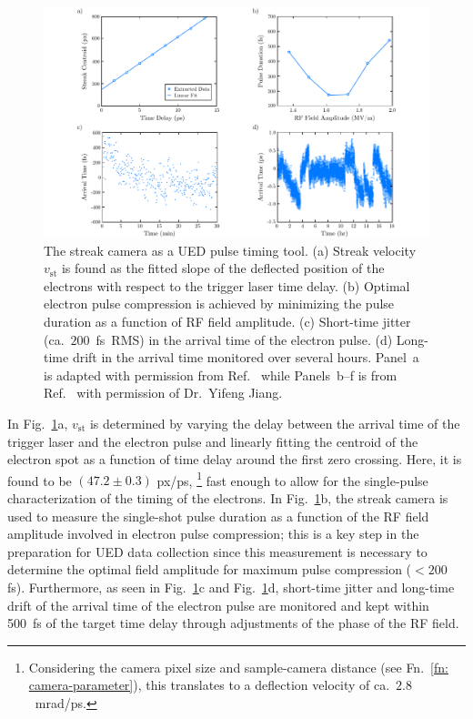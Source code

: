 \begin{figure}[ht!]
  \centering
  \includegraphics[width = \textwidth]{Figures/fig_ch2_electron-char2.pdf}
  \caption[The streak camera as a UED pulse timing tool.]{
    The streak camera as a UED pulse timing tool.
    (a) Streak velocity~$v_\textrm{st}$ is found as the fitted slope of the deflected position of the
    electrons with respect to the trigger laser time delay.
    (b) Optimal electron pulse compression is achieved by minimizing
    the pulse duration as a function of RF field amplitude.
    (c) Short-time jitter (ca.~$200$~fs~RMS) in the arrival time of the electron pulse.
    (d) Long-time drift in the arrival time monitored over several hours.
    Panel~a is adapted with permission from Ref.~\cite{Jiang2013} while
    Panels~b--f is from Ref.~\cite{Yifeng-thesis} with permission of Dr.~Yifeng Jiang.
  }
  \label{fig: electron-char2}
\end{figure}

In Fig.~\ref{fig: electron-char2}a,
$v_\textrm{st}$ is determined by varying the delay between the arrival time of the
trigger laser and the electron pulse and linearly fitting the centroid of the electron spot
as a function of time delay around the first zero crossing.
Here, it is found to be $(47.2 \pm 0.3)$ px/ps,%
\footnote{Considering the camera pixel size and sample-camera distance
(see Fn.~\ref{fn: camera-parameter}), this translates to a deflection velocity of ca.~$2.8$~mrad/ps.}
fast enough to allow for the single-pulse characterization of the timing of the electrons.
%
In Fig.~\ref{fig: electron-char2}b, the streak camera is used to measure
the single-shot pulse duration as a function of the RF field amplitude involved in electron pulse compression;
this is a key step in the preparation for UED data collection since this measurement is necessary
to determine the optimal field amplitude for maximum pulse compression ($< 200$ fs).
Furthermore, as seen in Fig.~\ref{fig: electron-char2}c and Fig.~\ref{fig: electron-char2}d,
short-time jitter and long-time drift of the arrival time of the electron pulse are monitored and
kept within 500~fs of the target time delay through adjustments of the phase of the RF field.

